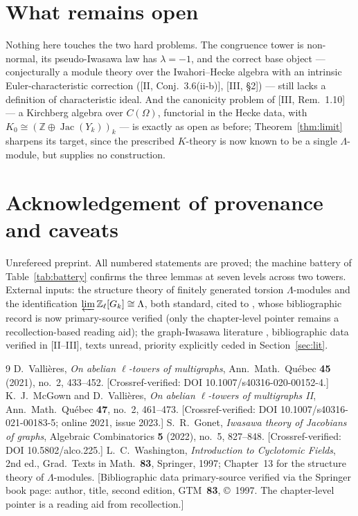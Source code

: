 \documentclass[11pt]{amsart}
\numberwithin{equation}{section}
\theoremstyle{definition}
\theoremstyle{remark}
\newcommand{\Z}{\mathbb{Z}}
\newcommand{\Zl}{\Z_\ell}
\newcommand{\La}{\Lambda}
\newcommand{\Jac}{\operatorname{Jac}}
\begin{document}
\section{What remains open}\label{sec:open}

Nothing here touches the two hard problems. The congruence tower is non-normal, its
pseudo-Iwasawa law has $\lambda=-1$, and the correct base object --- conjecturally a
module theory over the Iwahori--Hecke algebra with an intrinsic Euler-characteristic
correction ([II, Conj.~3.6(ii-b)], [III, \S2]) --- still lacks a definition of
characteristic ideal. And the canonicity problem of [III, Rem.~1.10] --- a Kirchberg
algebra over $C(\Omega)$, functorial in the Hecke data, with
$K_0\cong(\Z\oplus\Jac(Y_k))_k$ --- is exactly as open as before;
Theorem~\ref{thm:limit} sharpens its target, since the prescribed $K$-theory is now
known to be a single $\La$-module, but supplies no construction.

\section*{Acknowledgement of provenance and caveats}

Unrefereed preprint. All numbered statements are proved; the machine battery of
Table~\ref{tab:battery} confirms the three lemmas at seven levels across two towers.
External inputs: the structure theory of finitely generated torsion
$\La$-modules and the identification $\varprojlim\Zl[G_k]\cong\La$, both standard,
cited to \cite{Washington}, whose bibliographic record is now primary-source
verified (only the chapter-level pointer remains a recollection-based reading aid);
the graph-Iwasawa literature
\cite{Vallieres,McGownVallieres,Gonet}, bibliographic data verified in [II--III],
texts unread, priority explicitly ceded in Section~\ref{sec:lit}.

\begin{thebibliography}{9}
 D.~Vallières, \emph{On abelian $\ell$-towers of multigraphs},
Ann.\ Math.\ Qu\'ebec \textbf{45} (2021), no.~2, 433--452. [Crossref-verified:
DOI 10.1007/s40316-020-00152-4.]
 K.~J.~McGown and D.~Vallières, \emph{On abelian
$\ell$-towers of multigraphs II}, Ann.\ Math.\ Qu\'ebec \textbf{47}, no.~2,
461--473. [Crossref-verified: DOI 10.1007/s40316-021-00183-5; online 2021, issue
2023.]
 S.~R.~Gonet, \emph{Iwasawa theory of Jacobians of graphs}, Algebraic
Combinatorics \textbf{5} (2022), no.~5, 827--848. [Crossref-verified:
DOI 10.5802/alco.225.]
 L.~C.~Washington, \emph{Introduction to Cyclotomic Fields},
2nd ed., Grad.\ Texts in Math.\ \textbf{83}, Springer, 1997; Chapter~13 for the
structure theory of $\La$-modules. [Bibliographic data primary-source verified via
the Springer book page: author, title, second edition, GTM~\textbf{83},
\copyright~1997. The chapter-level pointer is a reading aid from recollection.]
\end{thebibliography}
\end{document}
